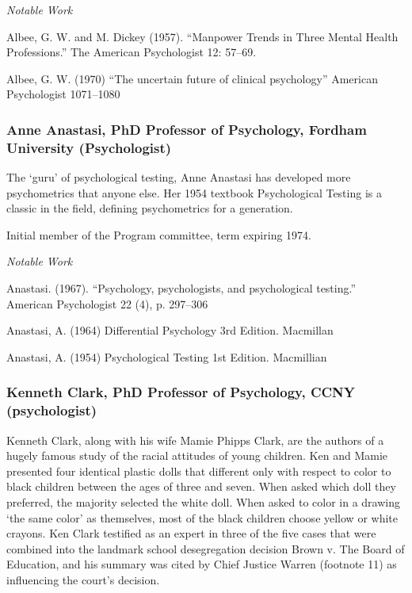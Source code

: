 \emph{Notable Work}

Albee, G. W. and M. Dickey (1957). ``Manpower Trends in Three Mental Health Professions.'' The American Psychologist 12: 57--69.

Albee, G. W. (1970) ``The uncertain future of clinical psychology'' American Psychologist 1071--1080

\subsubsection{Anne Anastasi, PhD Professor of Psychology, Fordham University (Psychologist)}
\label{anneanastasiphdprofessorofpsychologyfordhamuniversitypsychologist}

The `guru' of psychological testing, Anne Anastasi has developed more psychometrics that anyone else. Her 1954 textbook Psychological Testing is a classic in the field, defining psychometrics for a generation.

Initial member of the Program committee, term expiring 1974.

\emph{Notable Work}

Anastasi. (1967). ``Psychology, psychologists, and psychological testing.'' American Psychologist 22 (4), p. 297--306

Anastasi, A. (1964) Differential Psychology 3rd Edition. Macmillan

Anastasi, A. (1954) Psychological Testing 1st Edition. Macmillian

\subsubsection{Kenneth Clark, PhD Professor of Psychology, CCNY (psychologist)}
\label{kennethclarkphdprofessorofpsychologyccnypsychologist}

Kenneth Clark, along with his wife Mamie Phipps Clark, are the authors of a hugely famous study of the racial attitudes of young children. Ken and Mamie presented four identical plastic dolls that different only with respect to color to black children between the ages of three and seven. When asked which doll they preferred, the majority selected the white doll. When asked to color in a drawing `the same color' as themselves, most of the black children choose yellow or white crayons. Ken Clark testified as an expert in three of the five cases that were combined into the landmark school desegregation decision Brown v. The Board of Education, and his summary was cited by Chief Justice Warren (footnote 11) as influencing the court's decision.


